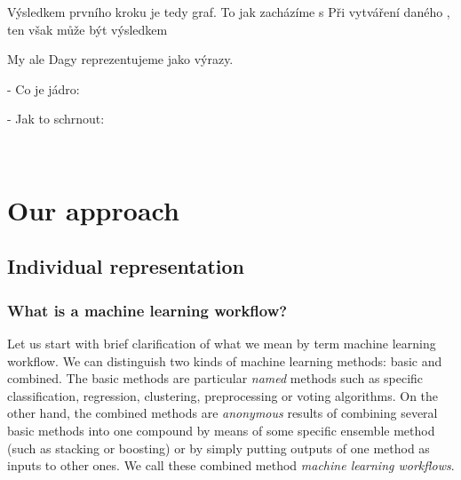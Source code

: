 \documentclass[a4paper,oneside]{memoir}
\begin{document}
 


Výsledkem prvního kroku je tedy graf. 
To jak zacházíme s Při vytváření daného , ten však může být výsledkem  

My ale
Dagy reprezentujeme jako výrazy.

- Co je jádro:

- Jak to schrnout:

~\\



\section{Our approach}


\newcommand{\Dlong}{unlabeled data\xspace}
\newcommand{\LDlong}{labeled data\xspace}
\newcommand{\Dshort}{\textit{$D$}\xspace}
\newcommand{\LDshort}{\textit{$LD$}\xspace}
\newcommand{\dia}{\textit{$ens_1$}\xspace}
\newcommand{\diaZero}{\textit{$ens_0$}\xspace}
\newcommand{\splitComb}{\textit{$split$}\xspace}
\newcommand{\cons}{\textit{$cons$}\xspace}

\newcommand{\komb}[1]{\textit{#1}}
\newcommand{\kons}[1]{\textbf{#1}}

\newcommand{\Dag}{\kons{Dag}}
\newcommand{\D}{\kons{D}}
\newcommand{\LD}{\kons{LD}}
\newcommand{\Boo}{\kons{Boo}}
\newcommand{\V}{\kons{V}}
\newcommand{\Succ}{\kons{S}}
\newcommand{\Zero}{\kons{0}}
\newcommand{\Same}{\kons{Same}}
\newcommand{\Disjoint}{\kons{Disjoint}}

\newcommand{\Suc}[1]{(\Succ\ #1)}
\newcommand{\Ve}[3]{(\V\ #1\ #2\ #3)}

\newcommand{\DAG}[2]{(\Dag\ #1\ #2)}
\newcommand{\splitter}[4]{\DAG{#1}{\Ve{#2}{#3}{#4}}}
\newcommand{\merger}[4]{\DAG{\Ve{#1}{#3}{#4}}{#2}}
\newcommand{\dvaPlus}[1]{\Suc{\Suc{#1}}}
\newcommand{\dva}{\dvaPlus{\Zero}}



\subsection{Individual representation}

\subsubsection{What is a machine learning workflow?}
Let us start with brief clarification of what we mean by term machine learning workflow. We can distinguish two kinds of machine learning methods: basic and combined. The basic methods are particular \textit{named} methods such as specific classification, regression, clustering, preprocessing or voting algorithms. On the other hand, the combined methods are \textit{anonymous} results of combining several basic methods into one compound by means of some specific ensemble method (such as stacking or boosting) or by simply putting outputs of one method as inputs to other ones. We call these combined method \textit{machine learning workflows}.
\end{document}
